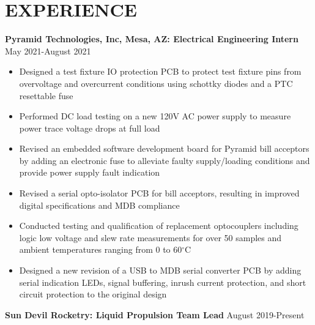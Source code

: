 \documentclass{article}
\begin{document}
\section{EXPERIENCE}
\textbf{Pyramid Technologies, Inc, Mesa, AZ: Electrical Engineering Intern}
\hfill 
\vspace{0.5em}
May 2021-August 2021
\begin{itemize}
\item{Designed a test fixture IO protection PCB to protect test fixture pins from overvoltage and overcurrent conditions using schottky diodes and a PTC resettable fuse}
\item{Performed DC load testing on a new 120V AC power supply to measure power trace voltage drops at full load}
\item{Revised an embedded software development board for Pyramid bill acceptors by adding an electronic fuse to alleviate faulty supply/loading conditions and provide power supply fault indication}
\item{Revised a serial opto-isolator PCB for bill acceptors, resulting in improved digital specifications and MDB compliance}
\item{Conducted testing and qualification of replacement optocouplers including logic low voltage and slew rate measurements for over 50 samples and ambient temperatures ranging from 0 to 60$^{\circ}$C}
\item{Designed a new revision of a USB to MDB serial converter PCB by adding serial indication LEDs, signal buffering, inrush current protection, and short circuit protection to the original design}
\end{itemize}
\vspace{0.5em}
\textbf{Sun Devil Rocketry: Liquid Propulsion Team Lead}
\hfill
\vspace{0.5em}
August 2019-Present
\end{document}
